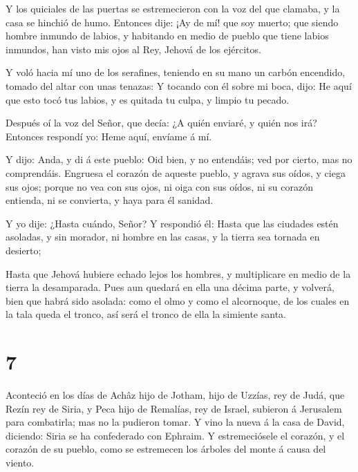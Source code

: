  Y los quiciales de las puertas se estremecieron con la voz
del que clamaba, y la casa se hinchió de humo.  Entonces
dije: ¡Ay de mí! que soy muerto; que siendo hombre inmundo de labios, y
habitando en medio de pueblo que tiene labios inmundos, han visto mis
ojos al Rey, Jehová de los ejércitos.

 Y voló hacia mí uno de los serafines, teniendo en su mano
un carbón encendido, tomado del altar con unas tenazas:  Y
tocando con él sobre mi boca, dijo: He aquí que esto tocó tus labios, y
es quitada tu culpa, y limpio tu pecado.

 Después oí la voz del Señor, que decía: ¿A quién enviaré, y
quién nos irá? Entonces respondí yo: Heme aquí, envíame á mí.

 Y dijo: Anda, y di á este pueblo: Oid bien, y no entendáis;
ved por cierto, mas no comprendáis.  Engruesa el corazón de
aqueste pueblo, y agrava sus oídos, y ciega sus ojos; porque no vea con
sus ojos, ni oiga con sus oídos, ni su corazón entienda, ni se
convierta, y haya para él sanidad.

 Y yo dije: ¿Hasta cuándo, Señor? Y respondió él: Hasta que
las ciudades estén asoladas, y sin morador, ni hombre en las casas, y la
tierra sea tornada en desierto;

 Hasta que Jehová hubiere echado lejos los hombres, y
multiplicare en medio de la tierra la desamparada.  Pues
aun quedará en ella una décima parte, y volverá, bien que habrá sido
asolada: como el olmo y como el alcornoque, de los cuales en la tala
queda el tronco, así será el tronco de ella la simiente santa.

\hypertarget{section-6}{%
\section{7}\label{section-6}}

 Aconteció en los días de Achâz hijo de Jotham, hijo de
Uzzías, rey de Judá, que Rezín rey de Siria, y Peca hijo de Remalías,
rey de Israel, subieron á Jerusalem para combatirla; mas no la pudieron
tomar.  Y vino la nueva á la casa de David, diciendo: Siria
se ha confederado con Ephraim. Y estremeciósele el corazón, y el corazón
de su pueblo, como se estremecen los árboles del monte á causa del
viento.

